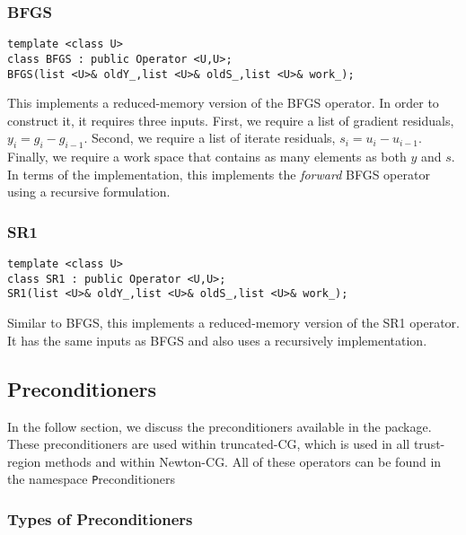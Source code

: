 \documentclass{article}
\begin{document}
\subsubsection{BFGS}

\begin{flushleft}
\begin{lstlisting}
template <class U>
class BFGS : public Operator <U,U>; 
BFGS(list <U>& oldY_,list <U>& oldS_,list <U>& work_);
\end{lstlisting}
\end{flushleft}

This implements a reduced-memory version of the BFGS operator.  In order to construct it, it requires three inputs.  First, we require a list of gradient residuals, $y_i=g_i-g_{i-1}$.  Second, we require a list of iterate residuals, $s_i=u_i-u_{i-1}$.  Finally, we require a work space that contains as many elements as both $y$ and $s$.  In terms of the implementation, this implements the {\it forward} BFGS operator using a recursive formulation.

\subsubsection{SR1}

\begin{flushleft}
\begin{lstlisting}
template <class U>
class SR1 : public Operator <U,U>; 
SR1(list <U>& oldY_,list <U>& oldS_,list <U>& work_);
\end{lstlisting}
\end{flushleft}

Similar to BFGS, this implements a reduced-memory version of the SR1 operator.  It has the same inputs as BFGS and also uses a recursively implementation.

\subsection{Preconditioners}

In the follow section, we discuss the preconditioners available in the package.  These preconditioners are used within truncated-CG, which is used in all trust-region methods and within Newton-CG.  All of these operators can be found in the namespace {\texttt Preconditioners}

\subsubsection{Types of Preconditioners}
\end{document}
